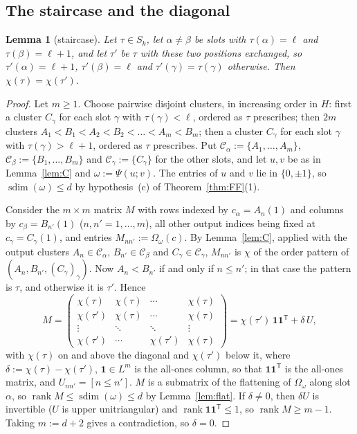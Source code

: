 \documentclass[11pt]{amsart}
\newtheorem{lemma}[theorem]{Lemma}
\theoremstyle{definition}
\theoremstyle{remark}
\numberwithin{equation}{section}
\newcommand{\cC}{\mathcal{C}}
\newcommand{\rank}{\operatorname{rank}}
\newcommand{\sdim}{\operatorname{sdim}}
\begin{document}
\subsection{The staircase and the diagonal}

\begin{lemma}[staircase]\label{lem:S}
Let $\tau\in S_k$, let $\alpha\neq\beta$ be slots with $\tau(\alpha)=\ell$ and $\tau(\beta)=\ell+1$, and let $\tau'$ be $\tau$
with these two positions exchanged, so $\tau'(\alpha)=\ell+1$, $\tau'(\beta)=\ell$ and $\tau'(\gamma)=\tau(\gamma)$ otherwise.
Then $\chi(\tau)=\chi(\tau')$.
\end{lemma}

\begin{proof}
Let $m\ge1$. Choose pairwise disjoint clusters, in increasing order in $H$: first a cluster $C_\gamma$ for each slot
$\gamma$ with $\tau(\gamma)<\ell$, ordered as $\tau$ prescribes; then $2m$ clusters $A_1<B_1<A_2<B_2<\dots<A_m<B_m$; then a
cluster $C_\gamma$ for each slot $\gamma$ with $\tau(\gamma)>\ell+1$, ordered as $\tau$ prescribes. Put
$\cC_\alpha:=\{A_1,\dots,A_m\}$, $\cC_\beta:=\{B_1,\dots,B_m\}$ and $\cC_\gamma:=\{C_\gamma\}$ for the other slots, and let
$u,v$ be as in Lemma~\ref{lem:C} and $\omega:=\Psi(u;v)$. The entries of $u$ and $v$ lie in $\{0,\pm1\}$, so
$\sdim(\omega)\le d$ by hypothesis~(c) of Theorem~\ref{thm:FF}(1).

Consider the $m\times m$ matrix $M$ with rows indexed by $c_\alpha=A_n(1)$ and columns by $c_\beta=B_{n'}(1)$
($n,n'=1,\dots,m$), all other output indices being fixed at $c_\gamma=C_\gamma(1)$, and entries $M_{nn'}:=\Omega_\omega(c)$.
By Lemma~\ref{lem:C}, applied with the output clusters $A_n\in\cC_\alpha$, $B_{n'}\in\cC_\beta$ and $C_\gamma\in\cC_\gamma$,
$M_{nn'}$ is $\chi$ of the order pattern of $(A_n,B_{n'},(C_\gamma)_\gamma)$. Now $A_n<B_{n'}$ if and only if $n\le n'$; in
that case the pattern is $\tau$, and otherwise it is $\tau'$. Hence
\[
M=\begin{pmatrix}
\chi(\tau)&\chi(\tau)&\cdots&\chi(\tau)\\
\chi(\tau')&\chi(\tau)&\cdots&\chi(\tau)\\
\vdots&\ddots&\ddots&\vdots\\
\chi(\tau')&\cdots&\chi(\tau')&\chi(\tau)
\end{pmatrix}
=\chi(\tau')\,\mathbf 1\mathbf 1^{\mathsf T}+\delta\,U,
\]
with $\chi(\tau)$ on and above the diagonal and $\chi(\tau')$ below it, where $\delta:=\chi(\tau)-\chi(\tau')$,
$\mathbf 1\in L^m$ is the all-ones column, so that $\mathbf 1\mathbf 1^{\mathsf T}$ is the all-ones matrix, and
$U_{nn'}=[n\le n']$.
$M$ is a submatrix of the flattening of $\Omega_\omega$ along slot $\alpha$, so $\rank M\le\sdim(\omega)\le d$ by
Lemma~\ref{lem:flat}. If $\delta\ne0$, then $\delta U$ is invertible ($U$ is upper unitriangular)
and $\rank\mathbf 1\mathbf 1^{\mathsf T}\le1$, so $\rank M\ge m-1$. Taking $m:=d+2$ gives a contradiction, so $\delta=0$.
\end{proof}
\end{document}
